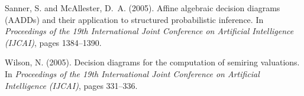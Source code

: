 \documentclass{article}
\theoremstyle{plain}
\theoremstyle{definition}
\begin{document}
\begin{thebibliography}{}
Sanner, S. and McAllester, D.~A. (2005).
\newblock Affine algebraic decision diagrams ({AADDs}) and their application to
  structured probabilistic inference.
\newblock In {\em Proceedings of the 19th International Joint Conference on
  Artificial Intelligence (IJCAI)}, pages 1384--1390.

Wilson, N. (2005).
\newblock Decision diagrams for the computation of semiring valuations.
\newblock In {\em Proceedings of the 19th International Joint Conference on
  Artificial Intelligence (IJCAI)}, pages 331--336.

\end{thebibliography}
\end{document}
